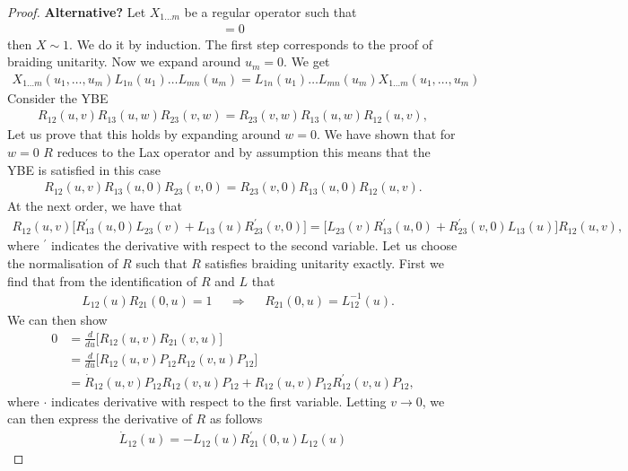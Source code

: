 \documentclass{article}
\begin{document}
\begin{proof}
\iffalse
\textbf{Alternative?}
Let $X_{1\ldots m}$ be a regular operator such that
%
\begin{align}
[X_{1 \ldots m} (u_1,\ldots, u_m) , L_{1n}(u_1)\ldots L_{mn}(u_m)]=0
\end{align}
%
then $X \sim 1$. We do it by induction. The first step corresponds to the proof of braiding unitarity. Now we expand around $u_m=0$. We get
%
\begin{align}
X_{1 \ldots m} (u_1,\ldots, u_m) L_{1n}(u_1)\ldots L_{mn}(u_m) = L_{1n}(u_1)\ldots L_{mn}(u_m) X_{1 \ldots m} (u_1,\ldots, u_m)
\end{align}
%
 Consider the YBE
%
\begin{align}
R_{12}(u,v) R_{13}(u,w) R_{23}(v,w) = R_{23}(v,w) R_{13} (u,w)R_{12}(u,v),
\end{align}
%
Let us prove that this holds by expanding around $w=0$. We have shown that for $w=0$ $R$ reduces to the Lax operator and by assumption this means that the YBE is satisfied in this case
%
\begin{align}
R_{12}(u,v) R_{13}(u,0) R_{23}(v,0) = R_{23}(v,0) R_{13} (u,0)R_{12}(u,v).
\end{align}
%
At the next order, we have that
%
\begin{align}
R_{12}(u,v)\Big[ R^\prime_{13}(u,0) L_{23}(v) +L_{13}(u)  R^\prime_{23}(v,0)\Big] = \Big[ L_{23}(v)R^\prime_{13}(u,0)  +  R^\prime_{23}(v,0) L_{13}(u)\Big]  R_{12}(u,v),
\end{align}
%
where $^\prime$ indicates the derivative with respect to the second variable. Let us choose the normalisation of $R$ such that $R$ satisfies braiding unitarity exactly.  First we find that from the identification of $R$ and $L$ that 
%
\begin{align}
&L_{12}(u) R_{21}(0,u) = 1
&& \Rightarrow
&&R_{21}(0,u)  = L^{-1}_{12}(u).
\end{align}
%
We can then show 
%
\begin{align}
0 &= \frac{d}{du} \Big[ R_{12}(u,v) R_{21}(v,u)  \Big] \\
&= \frac{d}{du} \Big[ R_{12}(u,v) P_{12} R_{12}(v,u)  P_{12} \Big]\\
&=  \dot{R}_{12}(u,v) P_{12} R_{12}(v,u)  P_{12} + R_{12}(u,v) P_{12} R^\prime_{12}(v,u)  P_{12},
\end{align}
%
where $\cdot$ indicates derivative with respect to the first variable. Letting $v\rightarrow 0$, we can then express the derivative of $R$ as follows
%
\begin{align}
  \dot{L}_{12}(u) = -L_{12}(u) R^\prime_{21}(0,u)  L_{12}(u)
\end{align}
%


\end{proof}
\end{document}
